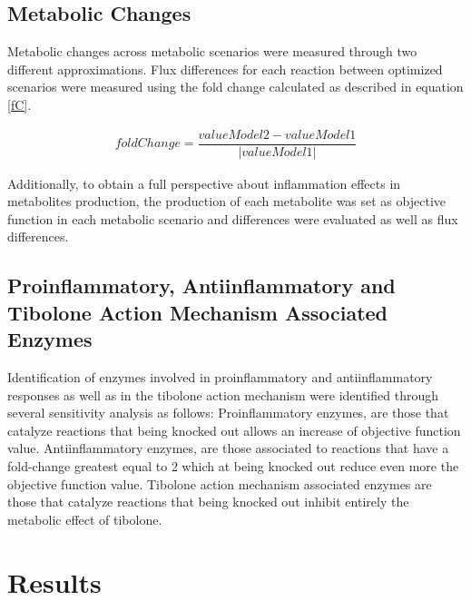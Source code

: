 \subsection*{Metabolic Changes}
Metabolic changes across metabolic scenarios were measured through two different approximations. Flux differences for each reaction between optimized scenarios were measured using the fold change calculated as described in equation \ref{fC}.
\begin{ceqn}
\begin{align}
\label{fC}
   foldChange = \dfrac{valueModel2-valueModel1}{\left|valueModel1\right|}
\end{align}
\end{ceqn}
Additionally, to obtain a full perspective about inflammation effects in metabolites production, the production of each metabolite was set as objective function in each metabolic scenario and differences were evaluated as well as flux differences.
\subsection*{Proinflammatory, Antiinflammatory and Tibolone Action Mechanism Associated Enzymes}
Identification of enzymes involved in proinflammatory and antiinflammatory responses as well as in the tibolone action mechanism were identified through several sensitivity analysis as follows: Proinflammatory enzymes, are those that catalyze reactions that being knocked out allows an increase of objective function value. Antiinflammatory enzymes, are those associated to reactions that have a fold-change greatest equal to 2 which at being knocked out reduce even more the objective function value. Tibolone action mechanism associated enzymes are those that catalyze reactions that being knocked out inhibit entirely the metabolic effect of tibolone.

\section{Results}
